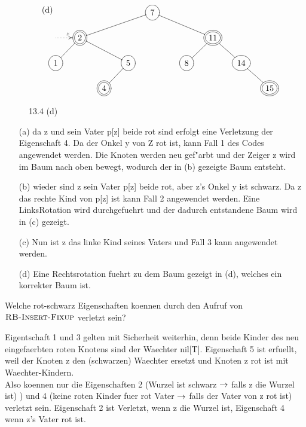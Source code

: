\documentclass[a4paper]{scrartcl}
\begin{document}
\begin{figure}[htb]
	\centering
	$\begin{xy}
		\entrymodifiers={}
		
		\xymatrixcolsep{1pc}
		\xymatrixrowsep{1pc}
		\text{(d)}
		\xymatrix {
& & & &*++[o][F-]{7}\ar@{-}[rrrd]\ar@{-}[llld]\\
 \ar@{.>}[r]^{z}&*++[o][F=]{2} \ar@{-}[rrd]\ar@{-}[ld]& & & & & & *++[o][F=]{11} \ar@{-}[rd]\ar@{-}[ld]& \\
*++[o][F-]{1}& & & *++[o][F-]{5}\ar@{-}[ld]  && &*++[o][F-]{8}&  & *++[o][F-]{14}\ar@{-}[rd] \\
& &*++[o][F=]{4} & & & & && & *++[o][F=]{15} \\
		}
	\end{xy}$
		\caption{13.4 (d)}
	\label{Abbildung 13.4 (d)}

\end{figure}


\begin{itemize}
\item[(a)] da z und sein Vater p[z] beide rot sind erfolgt eine Verletzung der Eigenschaft 4. Da der Onkel y von Z rot ist, kann Fall 1 des Codes angewendet werden. Die Knoten werden neu gef"arbt und der Zeiger z wird im Baum nach oben bewegt, wodurch der in (b) gezeigte Baum entsteht.
\item[(b)] wieder sind z sein Vater p[z] beide rot, aber z's Onkel y ist schwarz. Da z das rechte Kind von p[z] ist kann Fall 2 angewendet werden.
Eine LinksRotation wird durchgefuehrt und der dadurch entstandene Baum wird in (c) gezeigt.
\item[(c)] Nun ist z das linke Kind seines Vaters und Fall 3 kann angewendet werden. 
\item[(d)] Eine Rechtsrotation fuehrt zu dem Baum gezeigt in (d), welches ein korrekter Baum ist.
\end{itemize}
Welche rot-schwarz Eigenschaften koennen durch den Aufruf von $\textnormal{\scshape RB-Insert-Fixup}$ verletzt sein?

Eigentschaft 1 und 3 gelten mit Sicherheit weiterhin, denn beide Kinder des neu eingefaerbten roten Knotens sind der Waechter nil[T].
Eigenschaft 5 ist erfuellt, weil der Knoten z den (schwarzen) Waechter ersetzt und Knoten z rot ist mit Waechter-Kindern. \\
Also koennen nur die Eigenschaften 2 (Wurzel ist schwarz $\rightarrow$ falls z die Wurzel ist) ) und 4 (keine roten Kinder fuer rot Vater $\rightarrow$ falls der Vater von z rot ist) verletzt sein.
Eigenschaft 2 ist Verletzt, wenn z die Wurzel ist, Eigenschaft 4 wenn z's Vater rot ist.\\
\end{document}
